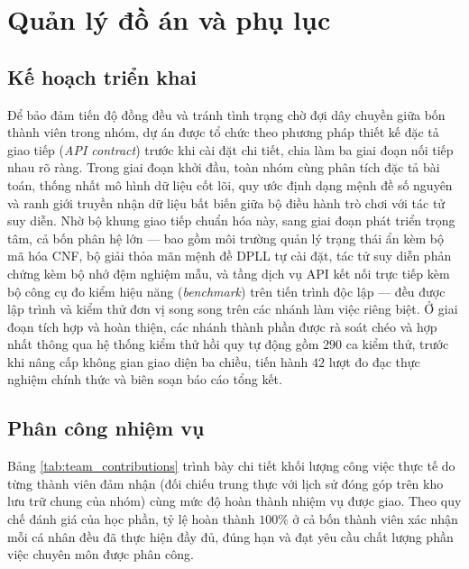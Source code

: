 \section{Quản lý đồ án và phụ lục}
\label{sec:contribution}

\subsection{Kế hoạch triển khai}
Để bảo đảm tiến độ đồng đều và tránh tình trạng chờ đợi dây chuyền giữa bốn thành
viên trong nhóm, dự án được tổ chức theo phương pháp thiết kế đặc tả giao tiếp
(\textit{API contract}) trước khi cài đặt chi tiết, chia làm ba giai đoạn nối tiếp
nhau rõ ràng. Trong giai đoạn khởi đầu, toàn nhóm cùng phân tích đặc tả bài toán,
thống nhất mô hình dữ liệu cốt lõi, quy ước định dạng mệnh đề số nguyên và ranh
giới truyền nhận dữ liệu bất biến giữa bộ điều hành trò chơi với tác tử suy diễn.
Nhờ bộ khung giao tiếp chuẩn hóa này, sang giai đoạn phát triển trọng tâm, cả bốn
phân hệ lớn --- bao gồm môi trường quản lý trạng thái ẩn kèm bộ mã hóa CNF, bộ
giải thỏa mãn mệnh đề DPLL tự cài đặt, tác tử suy diễn phản chứng kèm bộ nhớ đệm
nghiệm mẫu, và tầng dịch vụ API kết nối trực tiếp kèm bộ công cụ đo kiểm hiệu năng
(\textit{benchmark}) trên tiến trình độc lập --- đều được lập trình và kiểm thử đơn
vị song song trên các nhánh làm việc riêng biệt. Ở giai đoạn tích hợp và hoàn
thiện, các nhánh thành phần được rà soát chéo và hợp nhất thông qua hệ thống kiểm
thử hồi quy tự động gồm $290$ ca kiểm thử, trước khi nâng cấp không gian giao diện
ba chiều, tiến hành $42$ lượt đo đạc thực nghiệm chính thức và biên soạn báo cáo
tổng kết.

\subsection{Phân công nhiệm vụ}
Bảng \ref{tab:team_contributions} trình bày chi tiết khối lượng công việc thực tế
do từng thành viên đảm nhận (đối chiếu trung thực với lịch sử đóng góp trên kho
lưu trữ chung của nhóm) cùng mức độ hoàn thành nhiệm vụ được giao. Theo quy chế
đánh giá của học phần, tỷ lệ hoàn thành $100\%$ ở cả bốn thành viên xác nhận mỗi
cá nhân đều đã thực hiện đầy đủ, đúng hạn và đạt yêu cầu chất lượng phần việc
chuyên môn được phân công.


